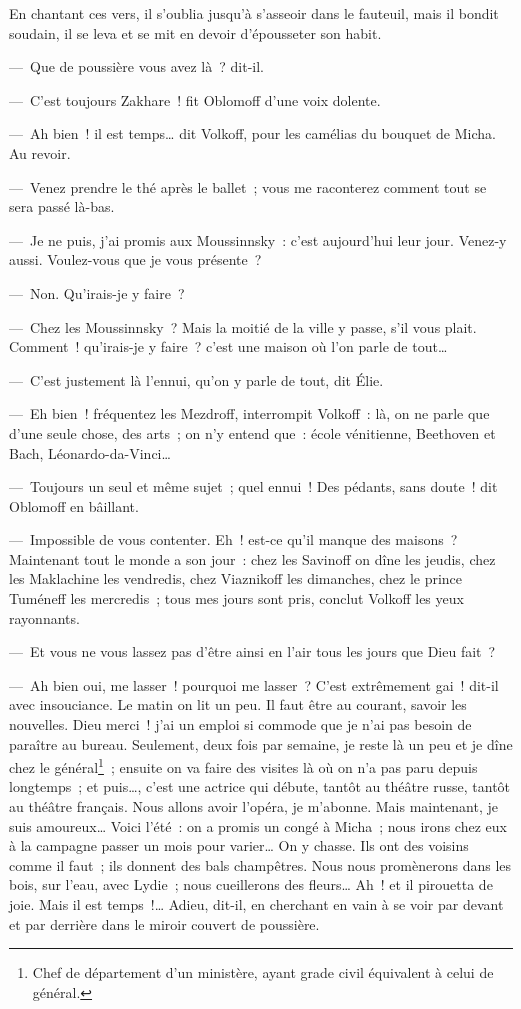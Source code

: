 \documentclass[french,twoside]{book} %
\begin{document}
\noindent En chantant ces vers, il s’oublia jusqu’à s’asseoir dans le fauteuil, mais il bondit soudain, il se leva et se mit en devoir d’épousseter son habit.\par
— Que de poussière vous avez là ? dit-il.\par
— C’est toujours Zakhare ! fit Oblomoff d’une voix dolente.\par
— Ah bien ! il est temps… dit Volkoff, pour les camélias du bouquet de Micha. Au revoir.\par
— Venez prendre le thé après le ballet ; vous me raconterez comment tout se sera passé là-bas.\par
— Je ne puis, j’ai promis aux Moussinnsky : c’est aujourd’hui leur jour. Venez-y aussi. Voulez-vous que je vous présente ?\par
— Non. Qu’irais-je y faire ?\par
— Chez les Moussinnsky ? Mais la moitié de la ville y passe, s’il vous plait. Comment ! qu’irais-je y faire ? c’est une maison où l’on parle de tout…\par
— C’est justement là l’ennui, qu’on y parle de tout, dit Élie.\par
— Eh bien ! fréquentez les Mezdroff, interrompit Volkoff : là, on ne parle que d’une seule chose, des arts ; on n’y entend que : école vénitienne, Beethoven et Bach, Léonardo-da-Vinci…\par
— Toujours un seul et même sujet ; quel ennui ! Des pédants, sans doute ! dit Oblomoff en bâillant.\par
— Impossible de vous contenter. Eh ! est-ce qu’il manque des maisons ? Maintenant tout le monde a son jour : chez les Savinoff on dîne les jeudis, chez les Maklachine les vendredis, chez Viaznikoff les dimanches, chez le prince Tuméneff les mercredis ; tous mes jours sont pris, conclut Volkoff les yeux rayonnants.\par
— Et vous ne vous lassez pas d’être ainsi en l’air tous les jours que Dieu fait ?\par
— Ah bien oui, me lasser ! pourquoi me lasser ? C’est extrêmement gai ! dit-il avec insouciance. Le matin on lit un peu. Il faut être au courant, savoir les nouvelles. Dieu merci ! j’ai un emploi si commode que je n’ai pas besoin de paraître au bureau. Seulement, deux fois par semaine, je reste là un peu et je dîne chez le général\footnote{Chef de département d’un ministère, ayant grade civil équivalent à celui de général.} ; ensuite on va faire des visites là où on n’a pas paru depuis longtemps ; et puis…, c’est une actrice qui débute, tantôt au théâtre russe, tantôt au théâtre français. Nous allons avoir l’opéra, je m’abonne. Mais maintenant, je suis amoureux… Voici l’été : on a promis un congé à Micha ; nous irons chez eux à la campagne passer un mois pour varier… On y chasse. Ils ont des voisins comme il faut ; ils donnent des bals champêtres. Nous nous promènerons dans les bois, sur l’eau, avec Lydie ; nous cueillerons des fleurs… Ah ! et il pirouetta de joie. Mais il est temps !… Adieu, dit-il, en cherchant en vain à se voir par devant et par derrière dans le miroir couvert de poussière.\par
\end{document}
